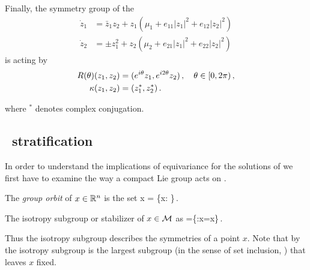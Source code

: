 \begin{example}
Finally, the symmetry group of the \AGHe
\begin{subequations}\label{eq:AGH}
\begin{align}
  \dot{z}_1 &=\bar{z}_1 z_2
              + z_1\left(\mu_1+ e_{11}|z_1|^2+e_{12}|z_2|^2\right) \\
  \dot{z}_2 &=\pm z_1^2
              + z_2\left(\mu_2+ e_{21}|z_1|^2+e_{22}|z_2|^2\right)
\end{align}
\end{subequations}
is  acting by
\begin{subequations}
\begin{align}
  \Rot{\theta}(z_1,z_2) &= (e^{i\theta} z_1, e^{i 2\theta} z_2)\,,\ \ \  \theta\in[0,2\pi)\,,\\
  \Refl(z_1,z_2) &= (z^\ast_1,z^\ast_2)\,.
\end{align}
\end{subequations}
\end{example}
where $^\ast$ denotes complex conjugation.

\subsection{\Statesp\ stratification}
\label{sec:strata}

In order to understand the implications of equivariance for the solutions
of  we first have to examine the way a compact
Lie group acts on .

 The \emph{group orbit} of $x\in\mathbb{R}^{n}$ is the set
\beq
	\Gamma x = \{\gamma x: \gamma\in\Gamma\}\,.
\eeq



\begin{definition}
\label{def:stab}
The isotropy subgroup or stabilizer of $x\in\mathcal{M}$ as
\beq
	=\{\gamma\in\Gamma:\gamma x=x\}\,.
\eeq
\end{definition}
Thus the isotropy subgroup describes the symmetries of a point $x$. Note that by
 the isotropy subgroup is the largest subgroup (in the
sense of set inclusion, \cf {}) that leaves $x$ fixed.

